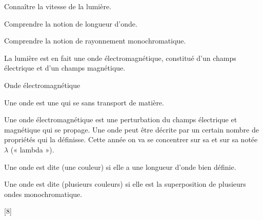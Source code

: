 \teteSndLumi

\vspace*{-30pt}


\begin{objectifs}
  \item Connaître la vitesse de la lumière.
  \item Comprendre la notion de longueur d'onde.
  \item Comprendre la notion de rayonnement monochromatique.
\end{objectifs}

\begin{contexte}
  La lumière est en fait une onde électromagnétique, constitué d'un champs électrique et d'un champs magnétique.
  
\end{contexte}


\begin{doc}{Onde électromagnétique}
  \begin{importants}
    Une onde est une  qui se  sans transport de matière.
  \end{importants}
  
  Une onde électromagnétique est une perturbation du champs électrique et magnétique qui se propage.
  Une onde peut être décrite par un certain nombre de propriétés qui la définisse.
  Cette année on va se concentrer sur sa  et sur sa  notée $\lambda$ (« lambda »).
  
  \begin{importants}
    Une onde est dite  (une couleur) si elle a une longueur d'onde bien définie.
    
    Une onde est dite  (plusieurs couleurs) si elle est la superposition de plusieurs ondes monochromatique.
  \end{importants}
\end{doc}

[8]


